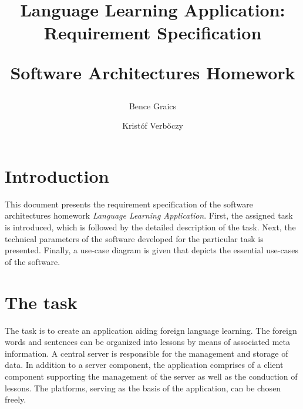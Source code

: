 \documentclass[a4paper]{article}
\begin{document}
	
	\newcommand{\specialcell}[2][c]{%
		\begin{tabular}[#1]{@{}c@{}}#2\end{tabular}}
	
	\newenvironment*{mytable}[3]{
		\begin{table}[htbp]	
			\caption{#1}          
			\label{tab:#2}            
			\center%
			\begin{tabular}{#3}
			}
			{
			\end{tabular}
		\end{table}
	}
	
	\pagestyle{plain}
	
	
	
	\nonfrenchspacing
	\setlength{\parindent}{0em}
	\setlength{\parskip}{0.45em}
	
	\title{Language Learning Application: \\ Requirement Specification \\ \begin{large}Software Architectures Homework \end{large}}
	\author{Bence Graics \and Kristóf Verbőczy}	
	\date{}
	\maketitle
	\section*{Introduction}
	This document presents the requirement specification of the software architectures homework \textsl{Language Learning Application}. First, the assigned task is introduced, which is followed by the detailed description of the task. Next, the technical parameters of the software developed for the particular task is presented. Finally, a use-case diagram is given that depicts the essential use-cases of the software.
	\section{The task}
	The task is to create an application aiding foreign language learning. The foreign words and sentences can be organized into lessons by means of associated meta information. A central server is responsible for the management and storage of data. In addition to a server component, the application comprises of a client component supporting the management of the server as well as the conduction of lessons. The platforms, serving as the basis of the application, can be chosen freely.
	
\end{document}
